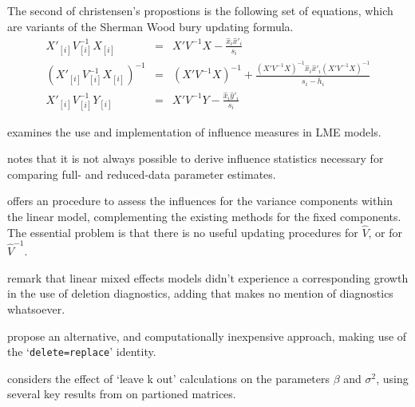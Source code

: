 \documentclass[12pt, a4paper]{report}
\theoremstyle{plain}
\theoremstyle{definition}
\theoremstyle{remark}
\begin{document}
	The second of christensen's propostions is the following set of
	equations, which are variants of the Sherman Wood bury updating
	formula.
	\begin{eqnarray}
	X'_{[i]}V_{[i]}^{-1}X_{[i]} &=& X' V^{-1}X -
	\frac{\hat{x}_{i}\hat{x}'_{i}}{s_{i}}\\
	(X'_{[i]}V_{[i]}^{-1}X_{[i]})^{-1} &=& (X' V^{-1}X)^{-1} +
	\frac{(X' V^{-1}X)^{-1}\hat{x}_{i}\hat{x}' _{i}
		(X' V^{-1}X)^{-1}}{s_{i}- \bar{h}_{i}}\\
	X'_{[i]}V_{[i]}^{-1}Y_{[i]} &=& X\prime V^{-1}Y -
	\frac{\hat{x}_{i}\hat{y}' _{i}}{s_{i}}
	\end{eqnarray}
	
	
	\citet{schabenberger} examines the use and implementation of
	influence measures in LME models.

\citet{schabenberger} notes that it is not always possible to
	derive influence statistics necessary for comparing full- and
	reduced-data parameter estimates.
	
\citet{HaslettDillane} offers an procedure to assess the influences for the variance components
	within the linear model, complementing the existing methods for the fixed components. The essential problem is that there is no useful updating procedures for $\hat{V}$, or for $\hat{V}^{-1}$.
		
\citet{HaslettDillane} remark that linear mixed effects models
		didn't experience a corresponding growth in the use of deletion
		diagnostics, adding that \citet{McCullSearle} makes no mention of
		diagnostics whatsoever.	
		
\citet{HaslettDillane} propose an alternative, and
	computationally inexpensive approach, making use of the
	`\texttt{delete=replace}' identity.
	
\citet{Haslett99} considers the effect of `leave k out'
	calculations on the parameters $\beta$ and $\sigma^{2}$, using
	several key results from \citet{HaslettHayes} on partioned
	matrices.

	
\end{document}
